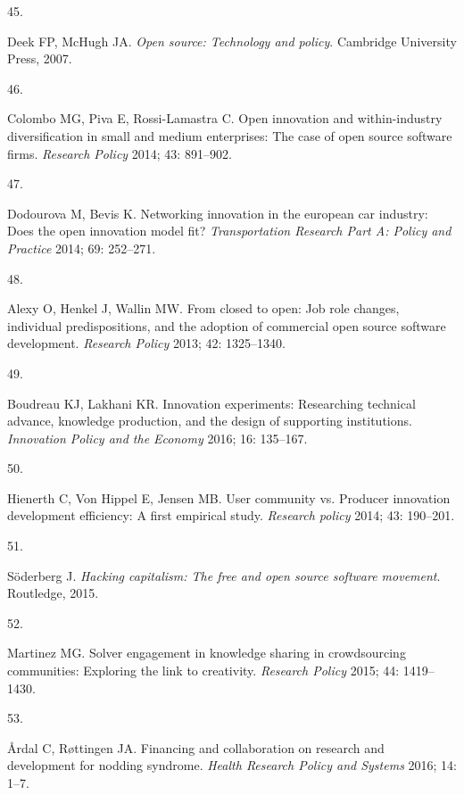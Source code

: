 \documentclass[
  12pt,
  a4paperpaper,
  onecolumn]{article}
\newlength{\cslhangindent}
\newlength{\csllabelwidth}
\newlength{\cslentryspacingunit} %
\newenvironment{CSLReferences}[2] %
 {%
  \setlength{\parindent}{0pt}
  \ifodd #1
  \let\oldpar\par
  \def\par{\hangindent=\cslhangindent\oldpar}
  \fi
  \setlength{\parskip}{#2\cslentryspacingunit}
 }%
 {}
\newcommand{\CSLLeftMargin}[1]{\parbox[t]{\csllabelwidth}{#1}}
\newcommand{\CSLRightInline}[1]{\parbox[t]{\linewidth - \csllabelwidth}{#1}\break}
\begin{document}
\begin{CSLReferences}{0}{0}
\leavevmode{}%
\CSLLeftMargin{45. }%
\CSLRightInline{Deek FP, McHugh JA. \emph{Open source: Technology and
policy}. Cambridge University Press, 2007.}

\leavevmode{}%
\CSLLeftMargin{46. }%
\CSLRightInline{Colombo MG, Piva E, Rossi-Lamastra C. Open innovation
and within-industry diversification in small and medium enterprises: The
case of open source software firms. \emph{Research Policy} 2014; 43:
891--902.}

\leavevmode{}%
\CSLLeftMargin{47. }%
\CSLRightInline{Dodourova M, Bevis K. Networking innovation in the
european car industry: Does the open innovation model fit?
\emph{Transportation Research Part A: Policy and Practice} 2014; 69:
252--271.}

\leavevmode{}%
\CSLLeftMargin{48. }%
\CSLRightInline{Alexy O, Henkel J, Wallin MW. From closed to open: Job
role changes, individual predispositions, and the adoption of commercial
open source software development. \emph{Research Policy} 2013; 42:
1325--1340.}

\leavevmode{}%
\CSLLeftMargin{49. }%
\CSLRightInline{Boudreau KJ, Lakhani KR. Innovation experiments:
Researching technical advance, knowledge production, and the design of
supporting institutions. \emph{Innovation Policy and the Economy} 2016;
16: 135--167.}

\leavevmode{}%
\CSLLeftMargin{50. }%
\CSLRightInline{Hienerth C, Von Hippel E, Jensen MB. User community vs.
Producer innovation development efficiency: A first empirical study.
\emph{Research policy} 2014; 43: 190--201.}

\leavevmode{}%
\CSLLeftMargin{51. }%
\CSLRightInline{Söderberg J. \emph{Hacking capitalism: The free and open
source software movement}. Routledge, 2015.}

\leavevmode{}%
\CSLLeftMargin{52. }%
\CSLRightInline{Martinez MG. Solver engagement in knowledge sharing in
crowdsourcing communities: Exploring the link to creativity.
\emph{Research Policy} 2015; 44: 1419--1430.}

\leavevmode{}%
\CSLLeftMargin{53. }%
\CSLRightInline{Årdal C, Røttingen JA. {Financing and collaboration on
research and development for nodding syndrome}. \emph{Health Research
Policy and Systems} 2016; 14: 1--7.}


\end{CSLReferences}
\end{document}
